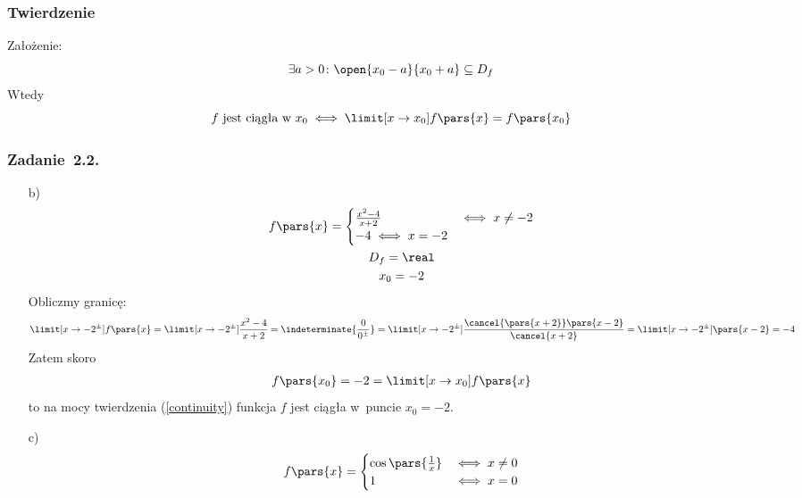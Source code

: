 \subsubsection*{Twierdzenie}
Założenie:
\begin{equation*}
    \exists a > 0\colon \open{x_0 - a}{x_0 + a} \subseteq D_f
\end{equation*}
Wtedy
\begin{equation}
    f \text{ jest ciągła w~} x_0 \iff \limit[x \to x_0] f\pars{x} = f\pars{x_0} \label{continuity}
\end{equation}
\subsubsection*{Zadanie~2.2.}
\begin{itemize}
    \item[b)]
        \begin{gather*}
            f\pars{x} = \begin{cases}
                \frac{x^2 - 4}{x + 2} & \iff x \neq -2\\
                -4 \iff x = -2
            \end{cases}\\
            D_f = \real\\
            x_0 = -2
        \end{gather*}
        Obliczmy granicę:
        \begin{equation*}
            \limit[x \to -2^\pm] f\pars{x}
                = \limit[x \to -2^\pm] \frac{x^2 - 4}{x + 2}
                = \indeterminate{\frac{0}{0^\pm}}
                = \limit[x \to -2^\pm] \frac{\cancel{\pars{x + 2}}\pars{x - 2}}{\cancel{x + 2}}
                = \limit[x \to -2^\pm] \pars{x - 2}
                = -4
        \end{equation*}
        Zatem skoro
        \begin{gather*}
            f\pars{x_0} = -2 = \limit[x \to x_0] f\pars{x}
        \end{gather*}
        to na mocy twierdzenia (\ref{continuity}) funkcja \(f\) jest ciągła w~puncie \(x_0 = -2\).
    \item[c)]
        \begin{gather*}
            f\pars{x} = \begin{cases}
                \cos\pars{\frac{1}{x}} & \iff x \neq 0\\
                1 & \iff x = 0
            \end{cases}\\

\end{gather*}
\end{itemize}
